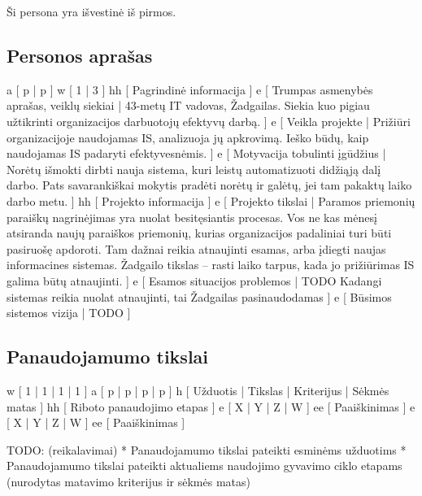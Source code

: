 ﻿Ši persona yra išvestinė iš pirmos.
\subsection{Personos aprašas}
\xtableu
{
  a [ p | p ]
  w [ 1 | 3 ]
  hh [ Pagrindinė informacija ]
  e [ Trumpas asmenybės aprašas, veiklų siekiai 
  | 
    43-metų IT vadovas, Žadgailas. Siekia kuo pigiau užtikrinti
    organizacijos darbuotojų efektyvų darbą.
  ]
  e [ Veikla projekte 
  | 
    Prižiūri organizacijoje naudojamas IS, analizuoja jų apkrovimą.
    Ieško būdų, kaip naudojamas IS padaryti efektyvesnėmis.
  ]
  e [ Motyvacija tobulinti įgūdžius 
  |
    Norėtų išmokti dirbti nauja sistema, kuri leistų automatizuoti
    didžiąją dalį darbo. Pats savarankiškai mokytis pradėti
    norėtų ir galėtų, jei tam pakaktų laiko darbo metu.
  ]
  hh [ Projekto informacija ]
  e [ Projekto tikslai 
  | 
    Paramos priemonių paraiškų nagrinėjimas yra nuolat
    besitęsiantis procesas. Vos ne kas mėnesį atsiranda naujų
    paraiškos priemonių, kurias organizacijos padaliniai turi būti
    pasiruošę apdoroti. Tam dažnai reikia atnaujinti esamas, arba
    įdiegti naujas informacines sistemas. Žadgailo tikslas – rasti
    laiko tarpus, kada jo prižiūrimas IS galima būtų atnaujinti.
  ]
  e [ Esamos situacijos problemos 
  | 
    TODO
    Kadangi sistemas reikia nuolat atnaujinti, tai Žadgailas
    pasinaudodamas 
  ]
  e [ Būsimos sistemos vizija 
  | 
    TODO  
  ]
}

\subsection{Panaudojamumo tikslai}
\xtable
{
  w [ 1 | 1 | 1 | 1 ]
  a [ p | p | p | p ]
  h [ Užduotis | Tikslas | Kriterijus | Sėkmės matas ]
  hh [ Riboto panaudojimo etapas ]
  e [ X | Y | Z | W ]
  ee [ Paaiškinimas ]
  e [ X | Y | Z | W ]
  ee [ Paaiškinimas ]
}

TODO: (reikalavimai)
* Panaudojamumo tikslai pateikti esminėms užduotims
* Panaudojamumo tikslai pateikti aktualiems naudojimo gyvavimo ciklo etapams (nurodytas matavimo kriterijus ir sėkmės matas)
